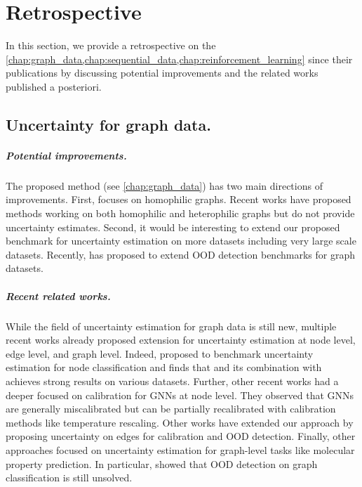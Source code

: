 \chapter{Retrospective}
\label{chap:retrospective_2}


In this section, we provide a retrospective on the \cref{chap:graph_data,chap:sequential_data,chap:reinforcement_learning} since their publications by discussing potential improvements and the related works published a posteriori.

\section{Uncertainty for graph data.}

\paragraph{Potential improvements.} The proposed method \GPNacro{} (see \cref{chap:graph_data}) has two main directions of improvements. First, \GPNacro{} focuses on homophilic graphs. Recent works have proposed methods \cite{bodnar2022sheaf, giovanni2022graff} working on both homophilic and heterophilic graphs but do not provide uncertainty estimates. Second, it would be interesting to extend our proposed benchmark for uncertainty estimation on more datasets including very large scale datasets. Recently, \cite{gui2022good} has proposed to extend OOD detection benchmarks for graph datasets.


\paragraph{Recent related works.} While the field of uncertainty estimation for graph data is still new, multiple recent works already proposed extension for uncertainty estimation at node level, edge level, and graph level. Indeed,  \cite{bazhenov2023revisiting} proposed to benchmark uncertainty estimation for node classification and finds that \GPNacro{} and its combination with \NatPN{} achieves strong results on various datasets. Further, other recent works \cite{texeira2019GNNmiscalibrated, hsu2022GNNmiscalibrated, wang2021confident} had a deeper focused on calibration for GNNs at node level. They observed that GNNs are generally miscalibrated but can be partially recalibrated with calibration methods like temperature rescaling. Other works \cite{zhou2022OODlink, hsu2022structure} have extended our approach by proposing uncertainty on edges for calibration and OOD detection. Finally, other approaches \cite{soleimany2021evidential} focused on uncertainty estimation for graph-level tasks like molecular property prediction. In particular, \cite{bazhenov2022ood} showed that OOD detection on graph classification is still unsolved.

